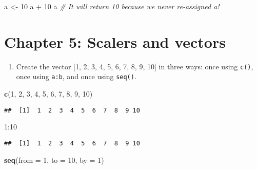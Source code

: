 \documentclass[]{book}
\newenvironment{Shaded}{\begin{snugshade}}{\end{snugshade}}
\newcommand{\KeywordTok}[1]{\textcolor[rgb]{0.13,0.29,0.53}{\textbf{{#1}}}}
\newcommand{\DataTypeTok}[1]{\textcolor[rgb]{0.13,0.29,0.53}{{#1}}}
\newcommand{\DecValTok}[1]{\textcolor[rgb]{0.00,0.00,0.81}{{#1}}}
\newcommand{\StringTok}[1]{\textcolor[rgb]{0.31,0.60,0.02}{{#1}}}
\newcommand{\CommentTok}[1]{\textcolor[rgb]{0.56,0.35,0.01}{\textit{{#1}}}}
\newcommand{\NormalTok}[1]{{#1}}
\providecommand{\tightlist}{%
  \setlength{\itemsep}{0pt}\setlength{\parskip}{0pt}}
\begin{document}
\begin{Shaded}
\begin{Highlighting}[]
\NormalTok{a <-}\StringTok{ }\DecValTok{10}
\NormalTok{a +}\StringTok{ }\DecValTok{10}
\NormalTok{a       }\CommentTok{# It will return 10 because we never re-assigned a!}
\end{Highlighting}
\end{Shaded}

\section{Chapter 5: Scalers and
vectors}\label{chapter-5-scalers-and-vectors}

\begin{enumerate}
\def\labelenumi{\arabic{enumi}.}
\tightlist
\item
  Create the vector {[}1, 2, 3, 4, 5, 6, 7, 8, 9, 10{]} in three ways:
  once using \texttt{c()}, once using \texttt{a:b}, and once using
  \texttt{seq()}.
\end{enumerate}

\begin{Shaded}
\begin{Highlighting}[]
\KeywordTok{c}\NormalTok{(}\DecValTok{1}\NormalTok{, }\DecValTok{2}\NormalTok{, }\DecValTok{3}\NormalTok{, }\DecValTok{4}\NormalTok{, }\DecValTok{5}\NormalTok{, }\DecValTok{6}\NormalTok{, }\DecValTok{7}\NormalTok{, }\DecValTok{8}\NormalTok{, }\DecValTok{9}\NormalTok{, }\DecValTok{10}\NormalTok{)}
\end{Highlighting}
\end{Shaded}

\begin{verbatim}
##  [1]  1  2  3  4  5  6  7  8  9 10
\end{verbatim}

\begin{Shaded}
\begin{Highlighting}[]
\DecValTok{1}\NormalTok{:}\DecValTok{10}
\end{Highlighting}
\end{Shaded}

\begin{verbatim}
##  [1]  1  2  3  4  5  6  7  8  9 10
\end{verbatim}

\begin{Shaded}
\begin{Highlighting}[]
\KeywordTok{seq}\NormalTok{(}\DataTypeTok{from =} \DecValTok{1}\NormalTok{, }\DataTypeTok{to =} \DecValTok{10}\NormalTok{, }\DataTypeTok{by =} \DecValTok{1}\NormalTok{)}
\end{Highlighting}
\end{Shaded}
\end{document}
